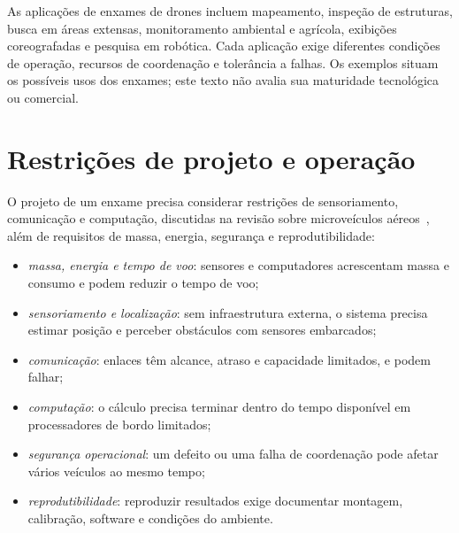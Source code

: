 \documentclass[11pt,a4paper,oneside]{book}
\numberwithin{equation}{chapter}
\begin{document}
As aplicações de enxames de drones incluem mapeamento, inspeção de estruturas, busca em áreas extensas, monitoramento ambiental e agrícola, exibições coreografadas e pesquisa em robótica. Cada aplicação exige diferentes condições de operação, recursos de coordenação e tolerância a falhas. Os exemplos situam os possíveis usos dos enxames; este texto não avalia sua maturidade tecnológica ou comercial.

\section{Restrições de projeto e operação}
O projeto de um enxame precisa considerar restrições de sensoriamento, comunicação e computação, discutidas na revisão sobre microveículos aéreos~\cite{survey}, além de requisitos de massa, energia, segurança e reprodutibilidade:
\begin{itemize}
\item \emph{massa, energia e tempo de voo}: sensores e computadores acrescentam massa e consumo e podem reduzir o tempo de voo;
\item \emph{sensoriamento e localização}: sem infraestrutura externa, o sistema precisa estimar posição e perceber obstáculos com sensores embarcados;
\item \emph{comunicação}: enlaces têm alcance, atraso e capacidade limitados, e podem falhar;
\item \emph{computação}: o cálculo precisa terminar dentro do tempo disponível em processadores de bordo limitados;
\item \emph{segurança operacional}: um defeito ou uma falha de coordenação pode afetar vários veículos ao mesmo tempo;
\item \emph{reprodutibilidade}: reproduzir resultados exige documentar montagem, calibração, software e condições do ambiente.
\end{itemize}
\end{document}

